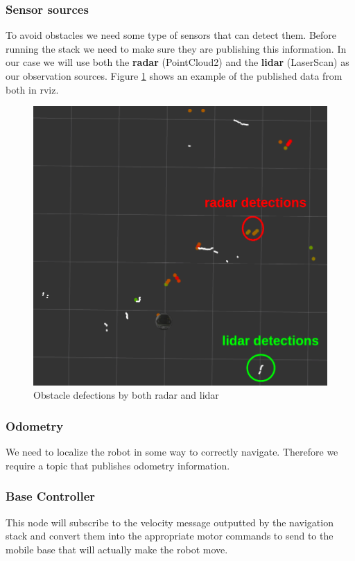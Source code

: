 \documentclass[12pt]{article}
\begin{document}
\subsubsection{Sensor sources}
To avoid obstacles we need some type of sensors that can detect them. Before running the stack we need to make sure they are publishing this information.
In our case we will use both the \textbf{radar} (PointCloud2) and the \textbf{lidar} (LaserScan) as our observation sources.
Figure \ref{fig:sensors} shows an example of the published data from both in rviz.
\begin{figure}[!htb]
    \centering
    \includegraphics[scale=0.2]{sensors2.png}
    \caption{Obstacle defections by both radar and lidar}
    \label{fig:sensors}
\end{figure}
\subsubsection{Odometry}
We need to localize the robot in some way to correctly navigate. Therefore we require a topic that publishes odometry information.
\subsubsection{Base Controller}
This node will subscribe to the velocity message outputted by the navigation stack and convert them into the appropriate motor commands to send to the mobile base that will actually make the robot move.
\end{document}
